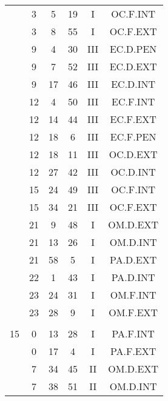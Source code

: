 \documentclass[12pt, a4paper]{article}
\begin{document}
\begin{multicols}{3}
{\begin{tabular}{c c c c c c}
	 	 	 	 & 3 & 5 & 19 & I & OC.F.INT\\%
	 	 	 	 & 3 & 8 & 55 & I & OC.F.EXT\\%
	 	 	 	 & 9 & 4 & 30 & III & EC.D.PEN\\%
	 	 	 	 & 9 & 7 & 52 & III & EC.D.EXT\\%
	 	 	 	 & 9 & 17 & 46 & III & EC.D.INT\\%
	 	 	 	 & 12 & 4 & 50 & III & EC.F.INT\\%
	 	 	 	 & 12 & 14 & 44 & III & EC.F.EXT\\%
	 	 	 	 & 12 & 18 & 6 & III & EC.F.PEN\\%
	 	 	 	 & 12 & 18 & 11 & III & OC.D.EXT\\%
	 	 	 	 & 12 & 27 & 42 & III & OC.D.INT\\%
	 	 	 	 & 15 & 24 & 49 & III & OC.F.INT\\%
	 	 	 	 & 15 & 34 & 21 & III & OC.F.EXT\\%
	 	 	 	 & 21 & 9 & 48 & I & OM.D.EXT\\%
	 	 	 	 & 21 & 13 & 26 & I & OM.D.INT\\%
	 	 	 	 & 21 & 58 & 5 & I & PA.D.EXT\\%
	 	 	 	 & 22 & 1 & 43 & I & PA.D.INT\\%
	 	 	 	 & 23 & 24 & 31 & I & OM.F.INT\\%
	 	 	 	 & 23 & 28 & 9 & I & OM.F.EXT\\%
	 	 	 	 & & & & & \\%
	 	 	 	15 & 0 & 13 & 28 & I & PA.F.INT\\%
	 	 	 	 & 0 & 17 & 4 & I & PA.F.EXT\\%
	 	 	 	 & 7 & 34 & 45 & II & OM.D.EXT\\%
	 	 	 	 & 7 & 38 & 51 & II & OM.D.INT\\%

\end{tabular}}
\end{multicols}
\end{document}
